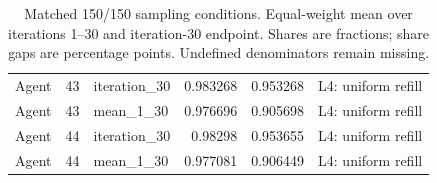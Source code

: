 \begin{table}[htbp!]
\begin{tabular}{lrlrrl}
Agent & 43 & iteration\_30 & 0.983268 & 0.953268 & L4: uniform refill \\
Agent & 43 & mean\_1\_30 & 0.976696 & 0.905698 & L4: uniform refill \\
Agent & 44 & iteration\_30 & 0.98298 & 0.953655 & L4: uniform refill \\
Agent & 44 & mean\_1\_30 & 0.977081 & 0.906449 & L4: uniform refill \\
\hline
\end{tabular}
\caption{Matched 150/150 sampling conditions. Equal-weight mean over iterations 1--30 and iteration-30 endpoint. Shares are fractions; share gaps are percentage points. Undefined denominators remain missing.}
\label{chap:results:tab:rq1_sampling_concentration}
\end{table}
